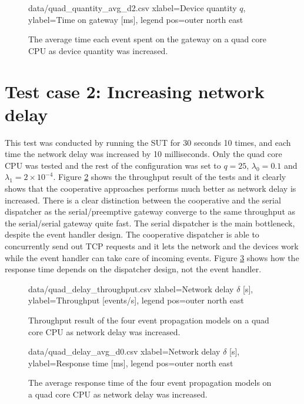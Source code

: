\begin{figure}[h!]
    \centering
    \performanceplot
    {data/quad_quantity_avg_d2.csv}
    {
        xlabel=Device quantity $q$,
        ylabel={Time on gateway [ms]},
        legend pos=outer north east
    }
    \caption{The average time each event spent on the gateway on a quad core
    CPU as device quantity was increased.}
    \label{fig:quad_quantity_avg_d2}
\end{figure}

\section{Test case 2: Increasing network delay}

This test was conducted by running the SUT for 30 seconds 10 times, and each
time the network delay was increased by 10 milliseconds. Only the quad core CPU
was tested and the rest of the configuration was set to $q = 25$, $\lambda_0 =
0.1$ and $\lambda_1 = 2 \times 10^{-4}$. Figure \ref{fig:quad_delay_throughput}
shows the throughput result of the tests and it clearly shows that the
cooperative approaches performs much better as network delay is increased.
There is a clear distinction between the cooperative and the serial dispatcher
as the serial/preemptive gateway converge to the same throughput as the
serial/serial gateway quite fast. The serial dispatcher is the main bottleneck,
despite the event handler design. The cooperative dispatcher is able to
concurrently send out TCP requests and it lets the network and the devices work
while the event handler can take care of incoming events. Figure
\ref{fig:quad_delay_avg_d0} shows how the response time depends on the
dispatcher design, not the event handler.

\begin{figure}[h!]
    \centering
    \performanceplot
    {data/quad_delay_throughput.csv}
    {
        xlabel={Network delay $\delta$ [s]},
        ylabel={Throughput [events/s]},
        legend pos=outer north east
    }
    \caption{Throughput result of the four event propagation models on a quad
    core CPU as network delay was increased.}
    \label{fig:quad_delay_throughput}
\end{figure}

\begin{figure}[h!]
    \centering
    \performanceplot
    {data/quad_delay_avg_d0.csv}
    {
        xlabel={Network delay $\delta$ [s]},
        ylabel={Response time [ms]},
        legend pos=outer north east
    }
    \caption{The average response time of the four event propagation models on
    a quad core CPU as network delay was increased.}
    \label{fig:quad_delay_avg_d0}
\end{figure}

